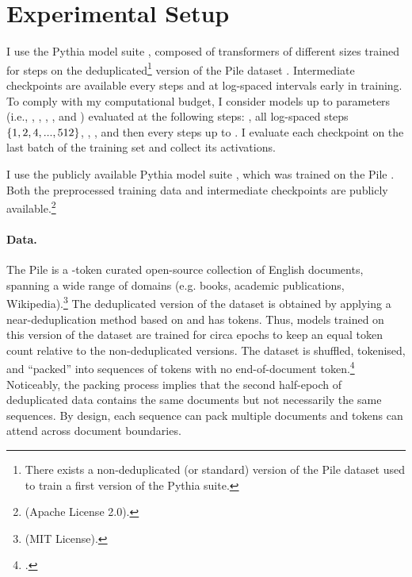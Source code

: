 \section{Experimental Setup}\label{sec:experimental_setup}

I use the Pythia model suite \citep{biderman2023pythia}, composed of  transformers of different sizes trained for  steps on the deduplicated\footnote{There exists a non-deduplicated (or standard) version of the Pile dataset used to train a first version of the Pythia suite.} version of the Pile dataset \citep{gao2020pile}.
Intermediate checkpoints are available every  steps and at log-spaced intervals early in training.
To comply with my computational budget, I consider models up to  parameters (i.e., \sevenmil, \sixmil, \fourmil, \onebil, and \twobil) evaluated at the following steps: , all log-spaced steps $\{1, 2, 4, ..., 512\}$, , , and then every  steps up to .
I evaluate each checkpoint on the last batch of the training set and collect its activations.

I use the publicly available Pythia model suite \citep{biderman2023pythia}, which was trained on the Pile \citep{gao2020pile}. Both the preprocessed training data and intermediate checkpoints are publicly available.\footnote{\href{https://github.com/EleutherAI/pythia}{} (Apache License 2.0).} 

\paragraph{Data.}
The Pile is a -token curated open-source collection of English documents, spanning a wide range of domains (e.g. books, academic publications, Wikipedia).\footnote{\href{https://github.com/EleutherAI/the-pile}{} (MIT License).}  
The deduplicated version of the dataset is obtained by applying a near-deduplication method based on  and has  tokens.
Thus, models trained on this version of the dataset are trained for circa  epochs to keep an equal token count relative to the non-deduplicated versions.
The dataset is shuffled, tokenised, and \enquote{packed} into sequences of  tokens with no end-of-document token.\footnote{\href{https://github.com/EleutherAI/pythia/issues/123}{}.}
Noticeably, the packing process implies that the second half-epoch of deduplicated data contains the same documents but not necessarily the same sequences. 
By design, each sequence can pack multiple documents and tokens can attend across document boundaries.

